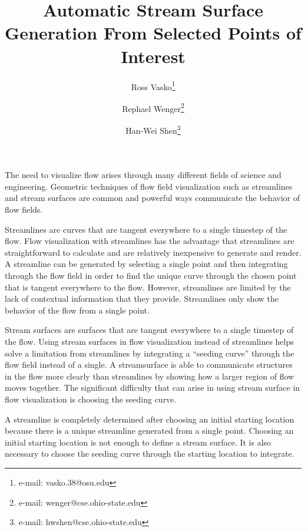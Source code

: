 \documentclass{vgtc}                          %
\title{Automatic Stream Surface Generation From Selected Points of Interest}
\author{Ross Vasko\thanks{e-mail: vasko.38@osu.edu} %
\and Rephael Wenger\thanks{e-mail: wenger@cse.ohio-state.edu} %
\and Han-Wei Shen\thanks{e-mail: hwshen@cse.ohio-state.edu }}
\affiliation{\scriptsize The Ohio State University}
\begin{document}


\maketitle

The need to visualize flow arises through many different fields of science and engineering.
Geometric techniques of flow field visualization such as streamlines and stream surfaces are common and powerful ways communicate the behavior of flow fields.

Streamlines are curves that are tangent everywhere to a single timestep of the flow.
Flow visualization with streamlines has the advantage that streamlines are straightforward to calculate and are relatively inexpensive to generate and render.
A streamline can be generated by selecting a single point and then integrating through the flow field in order to find the unique curve through the chosen point that is tangent everywhere to the flow.
However, streamlines are limited by the lack of contextual information that they provide.
Streamlines only show the behavior of the flow from a single point.

Stream surfaces are surfaces that are tangent everywhere to a single timestep of the flow.
Using stream surfaces in flow visualization instead of streamlines helps solve a limitation from streamlines by integrating a ``seeding curve'' through the flow field instead of a single.
A streamsurface is able to communicate structures in the flow more clearly than streamlines by showing how a larger region of flow moves together.
The significant difficulty that can arise in using stream surface in flow visualization is choosing the seeding curve.

A streamline is completely determined after choosing an initial starting location because there is a unique streamline generated from a single point.
Choosing an initial starting location is not enough to define a stream surface.
It is also necessary to choose the seeding curve through the starting location to integrate.
\end{document}
